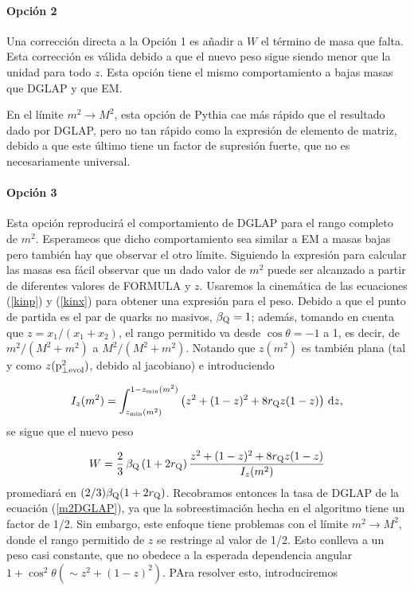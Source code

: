 \documentclass[a4paper,12pt]{article}
\begin{document}
\paragraph{Opción 2}

Una corrección directa a la Opción 1 es añadir a $W$ el término de masa que falta. Esta corrección es válida debido a que el nuevo peso sigue siendo menor que la unidad para todo $z$. Esta opción tiene el mismo comportamiento a bajas masas que DGLAP y que EM.

En el límite $m^2\to M^2$, esta opción de Pythia cae más rápido que el resultado dado por DGLAP, pero no tan rápido como la expresión de elemento de matriz, debido a que este último tiene un factor de supresión fuerte, que no es necesariamente universal.

\paragraph{Opción 3}

Esta opción reproducirá el comportamiento de DGLAP para el rango completo de $m^2$. Esperameos que dicho comportamiento sea similar a EM a masas bajas pero también hay que observar el otro límite. Siguiendo la expresión para calcular las masas esa fácil observar que un dado valor de $m^2$ puede ser alcanzado a partir de diferentes valores de FORMULA y $z$. Usaremos la cinemática de las ecuaciones (\ref{kinp}) y (\ref{kinx}) para obtener una expresión para el peso. Debido a que el punto de partida es el par de quarks no masivos, $\beta_{\mathrm Q}=1$; además, tomando en cuenta que $z=x_1/(x_1+x_2)$, el rango permitido va desde $\cos\theta=-1$ a 1, es decir, de $m^2/(M^2+m^2)$ a $M^2/(M^2+m^2)$. Notando que $z(m^2)$ es también plana (tal y como $z({\mathrm p}^2_{\perp\mathrm{evol}})$, debido al jacobiano) e introduciendo

\begin{equation}
I_z(m^2) = \int_{z_{\mathrm{min}}(m^2)}^{1 - z_{\mathrm{min}}(m^2)} 
\left( z^2 + (1 - z)^2 + 8 r_{{\mathrm Q}} z (1 - z) \right) \, {\mathrm d} z,
\label{intz}
\end{equation}
se sigue que el nuevo peso

\begin{equation}
W = \frac{2}{3} \, \beta_{{\mathrm Q}} \, (1 + 2 r_{{\mathrm Q}}) \,
\frac{ z^2 + (1 - z)^2 + 8 r_{{\mathrm Q}} z (1 - z) }{I_z(m^2)}
\label{wtone}
\end{equation}
promediará en $(2/3)\beta_{\mathrm Q}(1+2r_{\mathrm Q})$. Recobramos entonces la tasa de DGLAP de la ecuación (\ref{m2DGLAP}), ya que la sobreestimación hecha en el algoritmo tiene un factor de 1/2. Sin embargo, este enfoque tiene problemas con el límite $m^2\to M^2$, donde el rango permitido de $z$ se restringe al valor de 1/2. Esto conlleva a un peso casi constante, que no obedece a la esperada dependencia angular $1+\cos^2\theta (\sim z^2+(1-z)^2)$. PAra resolver esto, introduciremos
\end{document}
